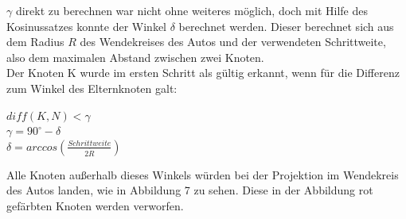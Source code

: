  $\gamma$ direkt zu berechnen war nicht ohne weiteres möglich, doch mit Hilfe des Kosinussatzes konnte der Winkel $\delta$ berechnet werden. Dieser berechnet sich aus dem Radius $R$ des Wendekreises des Autos und der verwendeten Schrittweite, also dem maximalen Abstand zwischen zwei Knoten. \\
Der Knoten K wurde im ersten Schritt als gültig erkannt, wenn für die Differenz zum Winkel des Elternknoten galt: 
\begin{center}
$diff(K,N) <\gamma$ \\
$\gamma = 90^{\circ} - \delta$  \\
$\delta = arccos (\frac{Schrittweite}{2 \dot R})$  \\
\end{center}

Alle Knoten außerhalb dieses Winkels würden bei der Projektion im Wendekreis des Autos landen, wie in Abbildung 7 zu sehen. Diese in der Abbildung rot gefärbten Knoten werden verworfen.\\
